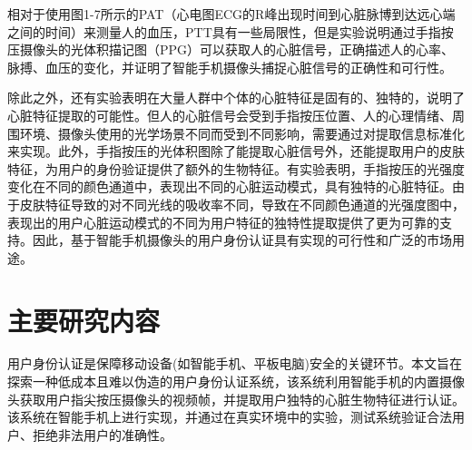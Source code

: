 {相对于使用图1-7所示的PAT（心电图ECG的R峰出现时间到心脏脉博到达远心端之间的时间）来测量人的血压，PTT具有一些局限性，但是实验\cite{2018Blood}说明通过手指按压摄像头的光体积描记图（PPG）可以获取人的心脏信号，正确描述人的心率、脉搏、血压的变化，并证明了智能手机摄像头捕捉心脏信号的正确性和可行性。}
\par
{除此之外，还有实验表明在大量人群中个体的心脏特征是固有的、独特的\cite{2011Heart,2002Near,2004Feature}，说明了心脏特征提取的可能性。但人的心脏信号会受到手指按压位置、人的心理情绪、周围环境、摄像头使用的光学场景不同而受到不同影响，需要通过对提取信息标准化来实现。此外，手指按压的光体积图除了能提取心脏信号外，还能提取用户的皮肤特征，为用户的身份验证提供了额外的生物特征。有实验表明，手指按压的光强度变化在不同的颜色通道中，表现出不同的心脏运动模式，具有独特的心脏特征\cite{2019CardioCam}。由于皮肤特征导致的对不同光线的吸收率不同，导致在不同颜色通道的光强度图中，表现出的用户心脏运动模式的不同为用户特征的独特性提取提供了更为可靠的支持。因此，基于智能手机摄像头的用户身份认证具有实现的可行性和广泛的市场用途。}
\section{主要研究内容}

	{用户身份认证是保障移动设备(如智能手机、平板电脑)安全的关键环节。本文旨在探索一种低成本且难以伪造的用户身份认证系统，该系统利用智能手机的内置摄像头获取用户指尖按压摄像头的视频帧，并提取用户独特的心脏生物特征进行认证。该系统在智能手机上进行实现，并通过在真实环境中的实验，测试系统验证合法用户、拒绝非法用户的准确性。}




